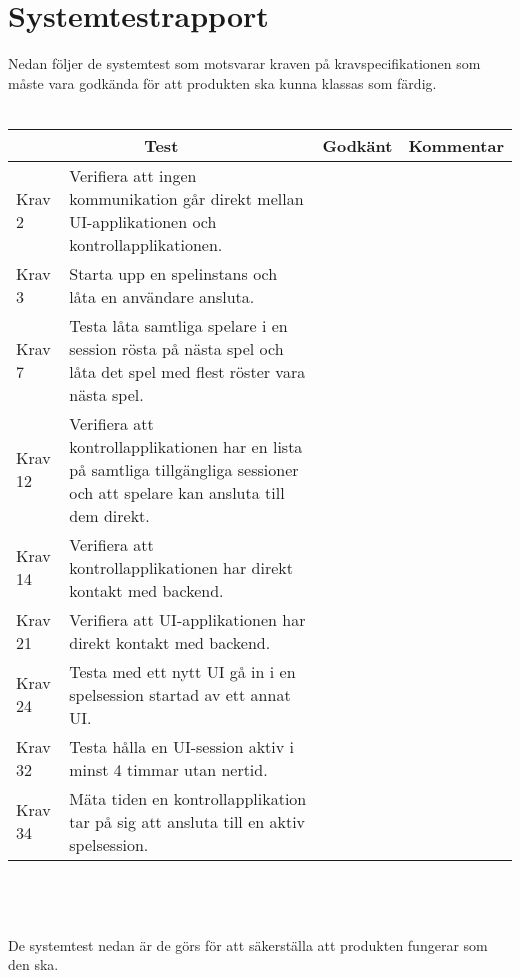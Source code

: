 \documentclass[10pt]{article}
\begin{document}
\section{Systemtestrapport}
Nedan följer de systemtest som motsvarar kraven på kravspecifikationen \cite{bib-kravspec} som måste vara godkända för att produkten ska kunna klassas som färdig.
\\ \\
\noindent
	\begin{tabular}{| p{1.5cm} | p{5cm} | p{1.2cm}| p{7cm}|}
  		\hline
    		\multicolumn{2}{|c|}{Test}&{Godkänt}&{Kommentar}\\
    		\hline
		Krav 2&Verifiera att ingen kommunikation går direkt mellan UI-applikationen och kontrollapplikationen.&&\\
		\hline
		Krav 3&Starta upp en spelinstans och låta en användare ansluta.&& \\
		\hline
		Krav 7& Testa låta samtliga spelare i en session rösta på nästa spel och låta det spel med flest röster vara nästa spel.&&\\
		\hline
		Krav 12& Verifiera att kontrollapplikationen har en lista på samtliga tillgängliga sessioner och att spelare kan ansluta till dem direkt.&& \\
		\hline
		Krav 14& Verifiera att kontrollapplikationen har direkt kontakt med backend.&& \\
		\hline
		Krav 21& Verifiera att UI-applikationen har direkt kontakt med backend.&& \\
		\hline
		Krav 24&Testa med ett nytt UI gå in i en spelsession startad av ett annat UI.&& \\
		\hline
		Krav 32& Testa hålla en UI-session aktiv i minst 4 timmar utan nertid.&& \\
		\hline
		Krav 34& Mäta tiden en kontrollapplikation tar på sig att ansluta till en aktiv spelsession.&& \\
		\hline   
  	\end{tabular}
\\ \\ \\
De systemtest nedan är de görs för att säkerställa att produkten fungerar som den ska.
\\ \\
\noindent
\end{document}

